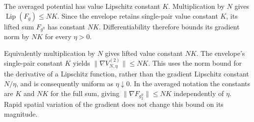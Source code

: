 \documentclass[11pt,a4paper]{report}
\begin{document}
The averaged potential has value Lipschitz constant \(K\). Multiplication by \(N\) gives \(\operatorname{Lip}(F_g)\le NK\). Since the envelope retains single-pair value constant \(K\), its lifted sum \(F_{g^\eta}\) has constant \(NK\). Differentiability therefore bounds its gradient norm by \(NK\) for every \(\eta>0\).



Equivalently multiplication by \(N\) gives lifted value constant \(NK\). The envelope’s single-pair constant \(K\) yields \(\|\nabla V_{N,\eta}^{(2)}\|\le NK\). This uses the norm bound for the derivative of a Lipschitz function, rather than the gradient Lipschitz constant \(N/\eta\), and is consequently uniform as \(\eta\downarrow0\). In the averaged notation the constants are \(K\) and \(NK\) for the full sum, giving \(\|\nabla F_{g_2^\eta}\|\le NK\) independently of \(\eta\). Rapid spatial variation of the gradient does not change this bound on its magnitude.
\end{document}
